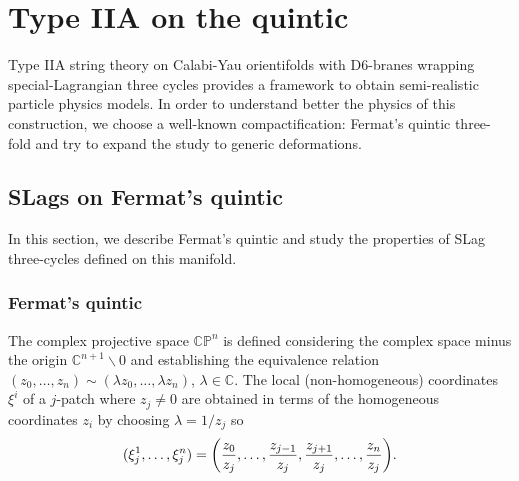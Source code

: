 \chapter{Type IIA on the quintic}

Type IIA string theory on Calabi-Yau orientifolds with D6-branes wrapping special-Lagrangian three cycles provides
a framework to obtain semi-realistic particle physics models.
In order to understand better the physics of this construction, we choose a well-known compactification:
Fermat's quintic three-fold and try to expand the study to generic deformations.

\section{SLags on Fermat's quintic}
In this section, we describe Fermat's quintic and study the properties of SLag three-cycles 
defined on this manifold.

\subsection{Fermat's quintic}
The complex projective space $\mathbb{CP}^n$ is defined considering the complex space minus the origin $\mathbb{C}^{n+1}\backslash\qty{0}$
and establishing the equivalence relation $( z_0,\ldots, z_{n})\sim(\lambda z_0,\ldots,\lambda z_{n})$, $\lambda\in\mathbb C$.
The local (non-homogeneous) coordinates $\xi^i$ of a $j$-patch where $z_j\neq0$ are obtained  in
terms of the homogeneous coordinates $z_i$ by choosing $\lambda=1/z_j$ so
\begin{equation}
  (\xi^1_j,\ldots,\xi^n_j)=\qty(\frac{z_0}{z_j},\ldots,\frac{z_{j-1}}{z_j},\frac{z_{j+1}}{z_j},\ldots,\frac{z_{n}}{z_j}).
\end{equation}

